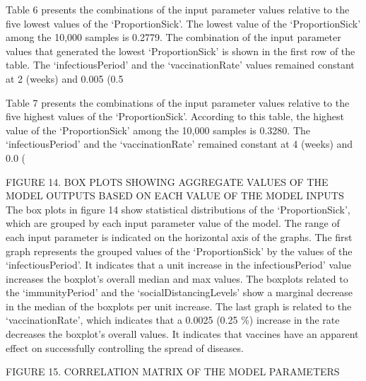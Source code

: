 \documentclass[smallextended]{svjour3}       %
\begin{document}
Table 6 presents the combinations of the input parameter values relative to the five lowest values of the ‘ProportionSick’. The lowest value of the ‘ProportionSick’ among the 10,000 samples is 0.2779. The combination of the input parameter values that generated the lowest ‘ProportionSick’ is shown in the first row of the table. The ‘infectiousPeriod’ and the ‘vaccinationRate’ values remained constant at 2 (weeks) and 0.005 (0.5%

Table 7 presents the combinations of the input parameter values relative to the five highest values of the ‘ProportionSick’. According to this table, the highest value of the ‘ProportionSick’ among the 10,000 samples is 0.3280. The ‘infectiousPeriod’ and the ‘vaccinationRate’ remained constant at 4 (weeks) and 0.0 (%


FIGURE 14. BOX PLOTS SHOWING AGGREGATE VALUES OF THE MODEL OUTPUTS BASED ON EACH VALUE OF THE MODEL INPUTS
The box plots in figure 14 show statistical distributions of the ‘ProportionSick’, which are grouped by each input parameter value of the model. The range of each input parameter is indicated on the horizontal axis of the graphs.
The first graph represents the grouped values of the ‘ProportionSick’ by the values of the ‘infectiousPeriod’. It indicates that a unit increase in the infectiousPeriod’ value increases the boxplot’s overall median and max values.
The boxplots related to the ‘immunityPeriod’ and the ‘socialDistancingLevels’ show a marginal decrease in the median of the boxplots per unit increase.
The last graph is related to the ‘vaccinationRate’, which indicates that a 0.0025 (0.25 \%) increase in the rate decreases the boxplot’s overall values. It indicates that vaccines have an apparent effect on successfully controlling the spread of diseases.



FIGURE 15. CORRELATION MATRIX OF THE MODEL PARAMETERS
\end{document}
